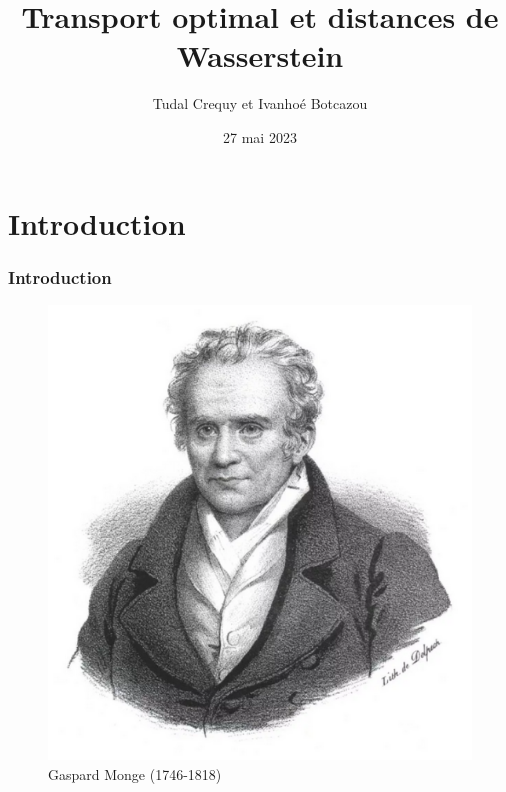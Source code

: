 \documentclass{beamer}
\title{Transport optimal et distances de Wasserstein}
\author{Tudal Crequy et Ivanhoé Botcazou}
\date{27 mai 2023}
\theoremstyle{definition}
\begin{document}
\begin{frame}[plain]
    \maketitle
\end{frame}

\section{Introduction}
\begin{frame}
	
\frametitle{Introduction}

	\begin{minipage}[t]{1\linewidth}
	\begin{minipage}{0.4\linewidth}\centering\begin{figure}
			\centering
			\includegraphics[scale=0.25]{monge.png}
			\caption*{Gaspard Monge (1746-1818)}
		\end{figure}\end{minipage}\quad \quad 
	\begin{minipage}{0.43\linewidth}\centering\begin{figure}
			

\end{figure}
\end{minipage}
\end{minipage}
\end{frame}
\end{document}

